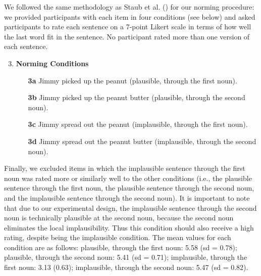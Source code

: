 \documentclass[
  12pt,
  letterpaper,
]{scrreprt}
\begin{document}
We followed the same methodology as Staub et al.
() for our norming
procedure: we provided participants with each item in four conditions
(see below) and asked participants to rate each sentence on a 7-point
Likert scale in terms of how well the last word fit in the sentence. No
participant rated more than one version of each sentence.

\begin{enumerate} \setcounter{enumi}{2}
   \item \textbf{Norming Conditions}
    \begin{enumerate}
        \item[\textbf{3a}] Jimmy picked up the peanut (plausible, through the first noun).
        \item[\textbf{3b}] Jimmy picked up the peanut butter (plausible, through the second noun).
        \item[\textbf{3c}] Jimmy spread out the peanut (implausible, through the first noun).
        \item[\textbf{3d}] Jimmy spread out the peanut butter (implausible, through the second noun).
    \end{enumerate} \label{figanext}
\end{enumerate}

Finally, we excluded items in which the implausible sentence through the
first noun was rated more or similarly well to the other conditions
(i.e., the plausible sentence through the first noun, the plausible
sentence through the second noun, and the implausible sentence through
the second noun). It is important to note that due to our experimental
design, the implausible sentence through the second noun is technically
plausible at the second noun, because the second noun eliminates the
local implausibility. Thus this condition should also receive a high
rating, despite being the implausible condition. The mean values for
each condition are as follows: plausible, through the first noun: 5.58
(sd = 0.78); plausible, through the second noun: 5.41 (sd = 0.71);
implausible, through the first noun: 3.13 (0.63); implausible, through
the second noun: 5.47 (sd = 0.82).
\end{document}
